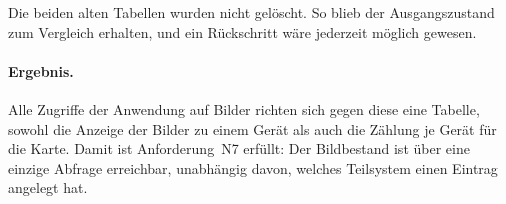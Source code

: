 \documentclass[12pt,a4paper]{report}
\begin{document}
Die beiden alten Tabellen wurden nicht gelöscht. So blieb der Ausgangszustand
zum Vergleich erhalten, und ein Rückschritt wäre jederzeit möglich gewesen.

\paragraph{Ergebnis.} Alle Zugriffe der Anwendung auf Bilder richten sich gegen
diese eine Tabelle, sowohl die Anzeige der Bilder zu einem Gerät als auch die
Zählung je Gerät für die Karte. Damit ist Anforderung~N7 erfüllt: Der
Bildbestand ist über eine einzige Abfrage erreichbar, unabhängig davon, welches
Teilsystem einen Eintrag angelegt hat.

\begin{figure}[htbp]
\centering
{}
\end{figure}
\end{document}
